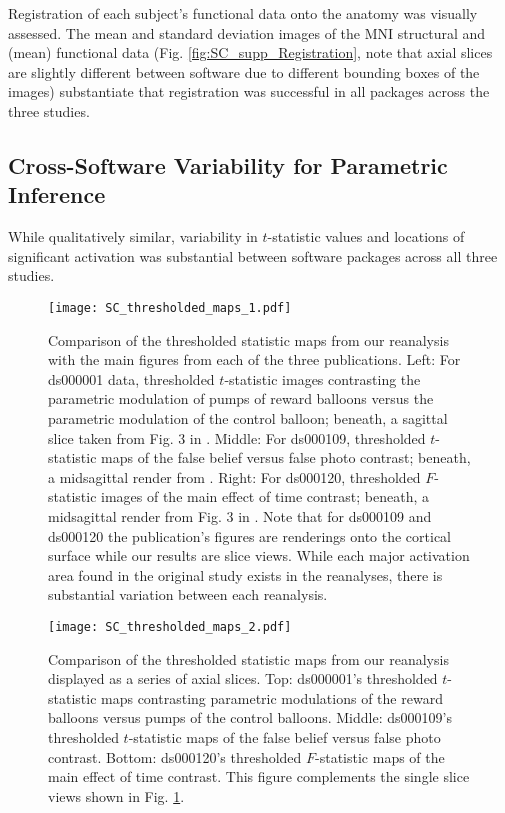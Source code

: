 Registration of each subject's functional data onto the anatomy was visually assessed. The mean and standard deviation images of the MNI structural and (mean) functional data (Fig. \ref{fig:SC_supp_Registration}, note that axial slices are slightly different between software due to different bounding boxes of the images) substantiate that registration was successful in all packages across the three studies. 

\subsection{Cross-Software Variability for Parametric Inference}

While qualitatively similar, variability in $t$-statistic values and locations of significant activation was substantial between software packages across all three studies. 

\begin{figure}[htbp]
\centering
	\texttt{[image: SC\_thresholded\_maps\_1.pdf]}	
\caption{Comparison of the thresholded statistic maps from our reanalysis with the main figures from each of the three publications. Left: For ds000001 data, thresholded $t$-statistic images contrasting the parametric modulation of pumps of reward balloons versus the parametric modulation of the control balloon; beneath, a sagittal slice taken from Fig. 3 in \citet{Schonberg2012-oo}. Middle: For ds000109, thresholded $t$-statistic maps of the false belief versus false photo contrast; beneath, a midsagittal render from \citet{Moran2012-cw}. Right: For ds000120, thresholded $F$-statistic images of the main effect of time contrast; beneath, a midsagittal render from Fig. 3 in \citet{Padmanabhan2011-dc}. Note that for ds000109 and ds000120 the publication's figures are renderings onto the cortical surface while our results are slice views. While each major activation area found in the original study exists in the reanalyses, there is substantial variation between each reanalysis.}
\label{fig:SC_thresholded_maps_1}
\end{figure}

\begin{figure}[htbp]
\centering
	\texttt{[image: SC\_thresholded\_maps\_2.pdf]}	
\caption{Comparison of the thresholded statistic maps from our reanalysis displayed as a series of axial slices. Top: ds000001's thresholded $t$-statistic maps contrasting parametric modulations of the reward balloons versus pumps of the control balloons. Middle: ds000109's thresholded $t$-statistic maps of the false belief versus false photo contrast. Bottom: ds000120's thresholded $F$-statistic maps of the main effect of time contrast. This figure complements the single slice views shown in Fig. \ref{fig:SC_thresholded_maps_1}.}
\label{fig:SC_thresholded_maps_2}
\end{figure}


